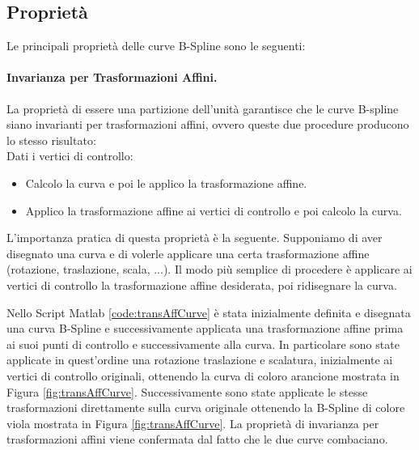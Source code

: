 \documentclass[a4paper, 12pt]{article}
\begin{document}


\subsection{Proprietà}

Le principali proprietà delle curve B-Spline sono le seguenti:

\paragraph{Invarianza per Trasformazioni Affini.}
La proprietà di essere una partizione dell'unità garantisce che le curve B-spline siano invarianti per trasformazioni affini, ovvero queste due procedure producono lo stesso risultato:\\
Dati i vertici di controllo:
\begin{itemize}
	\item Calcolo la curva e poi le applico la trasformazione affine.
	\item Applico la trasformazione affine ai vertici di controllo e poi calcolo
	      la curva.
\end{itemize}

L'importanza pratica di questa proprietà è la seguente. Supponiamo di aver disegnato una curva e di volerle applicare una certa trasformazione affine (rotazione,
traslazione, scala, ...). Il modo più semplice di procedere è applicare ai vertici di controllo la trasformazione affine desiderata, poi ridisegnare la curva.



Nello Script Matlab \ref{code:transAffCurve} è stata inizialmente definita e disegnata una curva B-Spline e successivamente applicata una trasformazione affine prima ai suoi punti di controllo e successivamente alla curva. In particolare sono state applicate in quest'ordine una rotazione traslazione e scalatura, inizialmente ai vertici di controllo originali, ottenendo la curva di coloro arancione mostrata in Figura \ref{fig:transAffCurve}. Successivamente sono state applicate le stesse trasformazioni direttamente sulla curva originale ottenendo la B-Spline di colore viola mostrata in Figura \ref{fig:transAffCurve}. La proprietà di invarianza per trasformazioni affini viene confermata dal fatto che le due curve combaciano.
\end{document}

